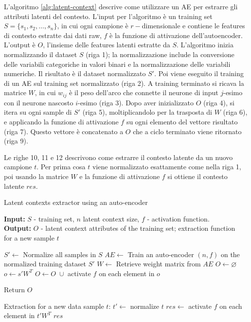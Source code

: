 \documentclass[12pt,italian]{report}
\begin{document}
L'algoritmo \ref{alg:latent-context} descrive come utilizzare un AE per estrarre gli attributi latenti del contesto. L'input per l'algoritmo è un training set $S = \{s_1, s_2, \dots, s_n\}$, in cui ogni campione è $r-$dimensionale e contiene le features di contesto estratte dai dati raw, $f$ è la funzione di attivazione dell'autoencoder. L'output è $O$, l'insieme delle features latenti estratte da $S$. L'algoritmo inizia normalizzando il dataset $S$ (riga 1); la normalizzazione include la conversione delle variabili categoriche in valori binari e la normalizzazione delle variabili numeriche. Il risultato è il dataset normalizzato $S'$. Poi viene eseguito il training di un AE sul training set normalizzato (riga 2). A training terminato si ricava la matrice $W$, in cui $w_{ij}$ è il peso dell'arco che connette il neurone di input $j$-esimo con il neurone nascosto $i$-esimo (riga 3). Dopo aver inizializzato $O$ (riga 4), si itera su ogni sample di $S'$ (riga 5), moltiplicandolo per la trasposta di $W$ (riga 6), e applicando la funzione di attivazione $f$ su ogni elemento del vettore risultato (riga 7). Questo vettore è concatenato a $O$ che a ciclo terminato viene ritornato (riga 9).

Le righe 10, 11 e 12 descrivono come estrarre il contesto latente da un nuovo campione $t$. Per prima cosa $t$ viene normalizzato esattamente come nella riga 1, poi usando la matrice $W$ e la funzione di attivazione $f$ si ottiene il contesto latente $res$.

\begin{algorithm}
\caption{Latent contexts extractor using an auto-encoder}
\label{alg:latent-context}
 \hspace*{\algorithmicindent} \textbf{Input:} $S$ - training set, $n$ latent context size, $f$ - activation function.\\
 \hspace*{\algorithmicindent} \textbf{Output:} $O$ - latent context attributes of the training set; extraction function\\ 
 \hspace*{\algorithmicindent} for a new sample $t$
\begin{algorithmic}[1]
\STATE $S' \leftarrow$ Normalize all samples in $S$
\STATE $AE \leftarrow$ Train an auto-encoder $(n,f)$ on the normalized training dataset $S'$
\STATE $W \leftarrow$ Retrieve weight matrix from $AE$
\STATE $O \leftarrow \varnothing$
	\STATE $o \leftarrow s'W^T$
	\STATE $O \leftarrow O \; \cup$ activate $f$ on each element in $o$ 
\ENDFOR

\STATE Return $O$

Extraction for a new data sample $t$:
\STATE $t' \leftarrow$ normalize $t$
\STATE $res \leftarrow$ activate $f$ on each element in $t'W^T$ 
\RETURN $res$

\end{algorithmic}
\end{algorithm}
\end{document}
